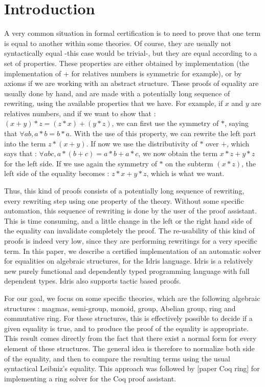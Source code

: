 \section{Introduction}


A very common situation in formal certification is to need to prove that one term is equal to another within some theories. Of course, they are usually not syntactically equal -this case would be trivial-, but they are equal according to a set of properties. These properties are either obtained by implementation (the implementation of + for relatives numbers is symmetric for example), or by axioms if we are working with an abstract structure.
These proofs of equality are usually done by hand, and are made with a potentially long sequence of rewriting, using the available properties that we have. For example, if $x$ and $y$ are relatives numbers, and if we want to show that :
$(x + y) * z = (z * x) + (y * z)$, we can first use the symmetry of $*$, saying that
$\forall a b, a * b = b * a$.
With the use of this property, we can rewrite the left part into the term $z * (x + y)$.
If now we use the distributivity of $*$ over $+$, which says that :
$\forall a b c, a * (b+c) = a*b + a*c$,
we now obtain the term $x*z + y*z$ for the left side.
If we use again the symmetry of $*$ on the subterm $(x*z)$, the left side of the equality becomes : $z*x + y*z$, which is what we want.

Thus, this kind of proofs consists of a potentially long sequence of rewriting, every rewriting step using one property of the theory. Without some specific automation, this sequence of rewriting is done by the user of the proof assistant. This is time consuming, and a little change in the left or the right hand side of the equality can invalidate completely the proof. The re-usability of this kind of proofs is indeed very low, since they are performing rewritings for a very specific term. In this paper, we describe a certified implementation of an automatic solver for equalities on algebraic structures, for the Idris language. Idris is a relatively new purely functional and dependently typed programming language with full dependent types. Idris also supports tactic based proofs. 

For our goal, we focus on some specific theories, which are the following algebraic structures : magmas, semi-group, monoid, group, Abelian group, ring and commutative ring.
For these structures, this is effectively possible to decide if a given equality is true, and to produce the proof of the equality is appropriate. This result comes directly from the fact that there exist a normal form for every element of these structures. The general idea is therefore to normalize both side of the equality, and then to compare the resulting terms using the usual syntactical Leibniz's equality.
This approach was followed by [paper Coq ring] for implementing a ring solver for the Coq proof assistant.

